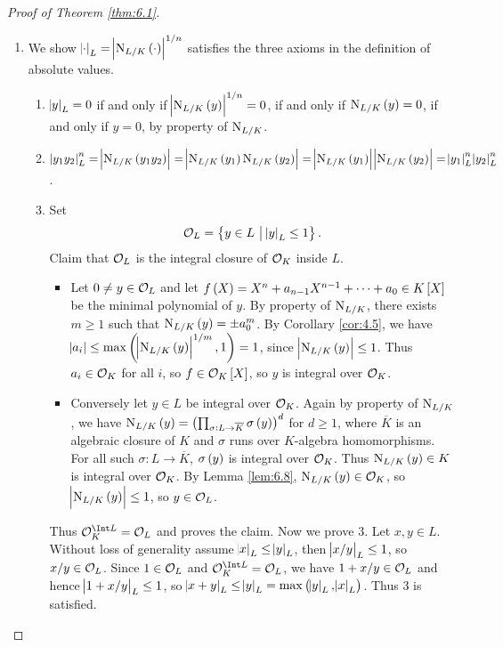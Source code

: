 \begin{proof}[Proof of Theorem \ref{thm:6.1}]
\hfill
\begin{enumerate}
\item We show $ \abs{\cdot}_L = \abs{\N_{L / K}\br{\cdot}}^{1 / n} $ satisfies the three axioms in the definition of absolute values.
\begin{enumerate}[label=\arabic*.]
\item $ \abs{y}_L = 0 $ if and only if $ \abs{\N_{L / K}\br{y}}^{1 / n} = 0 $, if and only if $ \N_{L / K}\br{y} = 0 $, if and only if $ y = 0 $, by property of $ \mathrm{N}_{L / K} $.
\item $ \abs{y_1y_2}_L^n = \abs{\N_{L / K}\br{y_1y_2}} = \abs{\N_{L / K}\br{y_1}\N_{L / K}\br{y_2}} = \abs{\N_{L / K}\br{y_1}}\abs{\N_{L / K}\br{y_2}} = \abs{y_1}_L^n\abs{y_2}_L^n $.
\item Set
$$ \OOO_L = \cbr{y \in L \st \abs{y}_L \le 1}. $$
Claim that $ \mathcal{O}_L $ is the integral closure of $ \mathcal{O}_K $ inside $ L $.
\begin{itemize}
\item Let $ 0 \ne y \in \mathcal{O}_L $ and let $ f\br{X} = X^n + a_{n - 1}X^{n - 1} + \dots + a_0 \in K\sbr{X} $ be the minimal polynomial of $ y $. By property of $ \mathrm{N}_{L / K} $, there exists $ m \ge 1 $ such that $ \N_{L / K}\br{y} = \pm a_0^m $. By Corollary \ref{cor:4.5}, we have $ \abs{a_i} \le \max\br{\abs{\N_{L / K}\br{y}}^{1 / m}, 1} = 1 $, since $ \abs{\N_{L / K}\br{y}} \le 1 $. Thus $ a_i \in \mathcal{O}_K $ for all $ i $, so $ f \in \OOO_K\sbr{X} $, so $ y $ is integral over $ \mathcal{O}_K $.
\item Conversely let $ y \in L $ be integral over $ \mathcal{O}_K $. Again by property of $ \mathrm{N}_{L / K} $, we have $ \N_{L / K}\br{y} = \br{\prod_{\sigma : L \to \overline{K}} \sigma\br{y}}^d $ for $ d \ge 1 $, where $ \overline{K} $ is an algebraic closure of $ K $ and $ \sigma $ runs over $ K $-algebra homomorphisms. For all such $ \sigma : L \to \overline{K} $, $ \sigma\br{y} $ is integral over $ \mathcal{O}_K $. Thus $ \N_{L / K}\br{y} \in K $ is integral over $ \mathcal{O}_K $. By Lemma \ref{lem:6.8}, $ \N_{L / K}\br{y} \in \OOO_K $, so $ \abs{\N_{L / K}\br{y}} \le 1 $, so $ y \in \mathcal{O}_L $.
\end{itemize}
Thus $ \OOO_K^{\Int L} = \OOO_L $ and proves the claim. Now we prove $ 3 $. Let $ x, y \in L $. Without loss of generality assume $ \abs{x}_L \le \abs{y}_L $, then $ \abs{x / y}_L \le 1 $, so $ x / y \in \mathcal{O}_L $. Since $ 1 \in \mathcal{O}_L $ and $ \OOO_K^{\Int L} = \OOO_L $, we have $ 1 + x / y \in \mathcal{O}_L $ and hence $ \abs{1 + x / y}_L \le 1 $, so $ \abs{x + y}_L \le \abs{y}_L = \max\br{\abs{y}_L, \abs{x}_L} $. Thus $ 3 $ is satisfied.

\end{enumerate}
\end{enumerate}
\end{proof}
